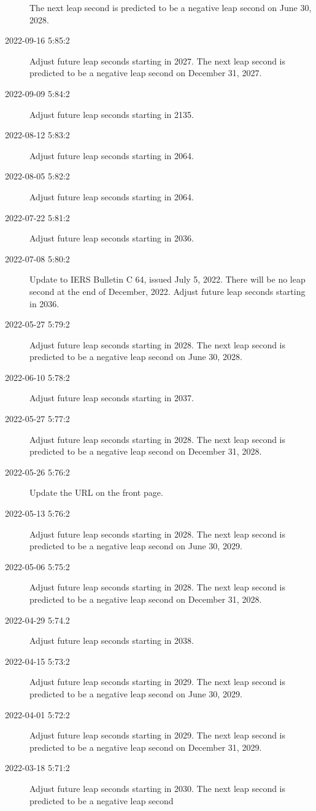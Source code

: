 \documentclass[letterpaper,twoside]{article}
\begin{document}
\begin{description}
  The next leap second is predicted to be a negative leap second
  on June 30, 2028.
\item[2022-09-16 5:85:2]Adjust future leap seconds starting in 2027.
  The next leap second is predicted to be a negative leap second
  on December 31, 2027.
\item[2022-09-09 5:84:2]Adjust future leap seconds starting in 2135.
\item[2022-08-12 5:83:2]Adjust future leap seconds starting in 2064.
\item[2022-08-05 5:82:2]Adjust future leap seconds starting in 2064.
\item[2022-07-22 5:81:2]Adjust future leap seconds starting in 2036.
\item[2022-07-08 5:80:2]Update to IERS Bulletin C 64,
  issued July 5, 2022.
  There will be no leap second at the end of December, 2022.
  Adjust future leap seconds starting in 2036.
\item[2022-05-27 5:79:2]Adjust future leap seconds starting in 2028.
  The next leap second is predicted to be a negative leap second
  on June 30, 2028.
\item[2022-06-10 5:78:2]Adjust future leap seconds starting in 2037.
\item[2022-05-27 5:77:2]Adjust future leap seconds starting in 2028.
  The next leap second is predicted to be a negative leap second
  on December 31, 2028.
\item[2022-05-26 5:76:2]Update the URL on the front page.
\item[2022-05-13 5:76:2]Adjust future leap seconds starting in 2028.
  The next leap second is predicted to be a negative leap second
  on June 30, 2029.
\item[2022-05-06 5:75:2]Adjust future leap seconds starting in 2028.
  The next leap second is predicted to be a negative leap second
  on December 31, 2028.
\item[2022-04-29 5:74.2]Adjust future leap seconds starting in 2038.
\item[2022-04-15 5:73:2]Adjust future leap seconds starting in 2029.
  The next leap second is predicted to be a negative leap second
  on June 30, 2029.
\item[2022-04-01 5:72:2]Adjust future leap seconds starting in 2029.
  The next leap second is predicted to be a negative leap second
  on December 31, 2029.
\item[2022-03-18 5:71:2]Adjust future leap seconds starting in 2030.
  The next leap second is predicted to be a negative leap second

\end{description}
\end{document}
